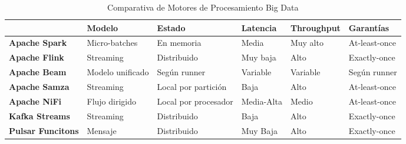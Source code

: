 \begin{table}[htbp]
    \footnotesize
    \renewcommand{\arraystretch}{1.2}
    \centering
    \caption{Comparativa de Motores de Procesamiento Big Data}
    \label{tab:comparison-engines}
    \setlength{\tabcolsep}{3pt}
    \begin{tabularx}{\textwidth}{|>{\raggedright\arraybackslash}m{2.2cm}|>{\raggedright\arraybackslash}m{}|>{\raggedright\arraybackslash}m{}|>{\raggedright\arraybackslash}m{}|>{\raggedright\arraybackslash}m{}|>{\raggedright\arraybackslash}m{}|}
    \hline
    \rule{0pt}{5ex} & \textbf{Modelo} & \textbf{Estado} & \textbf{Latencia} & \textbf{Throughput} & \textbf{Garantías} \\[0.3ex]
    \hline
    \textbf{Apache Spark} & Micro-batches & En memoria & Media & Muy alto & At-least-once \\[0.3ex]
    \hline
    \textbf{Apache Flink} & Streaming & Distribuido & Muy baja & Alto & Exactly-once \\[0.3ex]
    \hline
    \textbf{Apache Beam} & Modelo unificado & Según runner & Variable & Variable & Según runner \\[0.3ex]
    \hline
    \textbf{Apache Samza} & Streaming & Local por partición & Baja & Alto & At-least-once \\[0.3ex]
    \hline
    \textbf{Apache NiFi} & Flujo dirigido & Local por procesador & Media-Alta & Medio & At-least-once \\[0.3ex]
    \hline
    \textbf{Kafka Streams} & Streaming & Distribuido & Baja & Alto & Exactly-once \\[0.3ex]
    \hline
    \textbf{Pulsar Funcitons} & Mensaje & Distribuido & Muy Baja & Alto & Exactly-once \\[0.3ex]
    \hline
    \end{tabularx}
    \end{table}